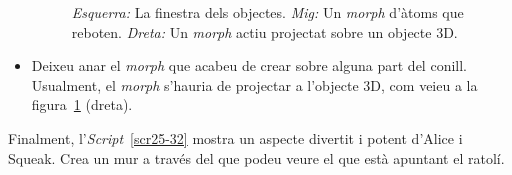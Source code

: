 \begin{itemize}
\begin{figure}[h!]
\begin{center}
\end{center}
\caption{\emph{Esquerra:} La finestra dels objectes.
\emph{Mig:} Un \emph{morph} d'àtoms que reboten.
\emph{Dreta:} Un \emph{morph} actiu projectat sobre un objecte 3D.}
\label{fig2513}
\end{figure}
\item Deixeu anar el \emph{morph} que acabeu de crear sobre alguna part del conill. Usualment, el \emph{morph} s'hauria de projectar a l'objecte 3D, com veieu a la figura~\ref{fig2513} (dreta).
\end{itemize}

Finalment, l'\emph{Script}~\ref{scr25-32} mostra un aspecte divertit i potent d'Alice i Squeak. Crea un mur a través del que podeu veure el que està apuntant el ratolí.
